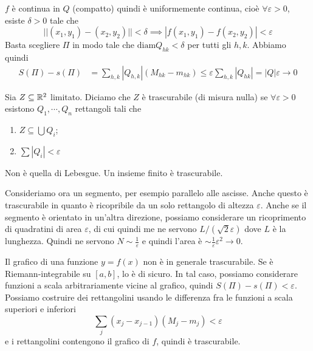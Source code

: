 \documentclass[a4paper]{article}
\begin{document}
\begin{snippetproof}{}
    \(f\) è continua in \(Q\) (compatto) quindi è uniformemente continua,
    cioè \(\forall \varepsilon > 0\), esiste \(\delta > 0\)
    tale che
    \[
        ||(x_1,y_1) - (x_2, y_2)|| < \delta \implies |f(x_1,y_1) - f(x_2, y_2)| < \varepsilon
    \]
    Basta scegliere \(\Pi\) in modo tale che \(\text{diam} Q_{hk} < \delta\)
    per tutti gli \(h,k\). Abbiamo quindi
    \begin{align*}
        S(\Pi)- s(\Pi)
        &= \sum_{h,k} |Q_{h,k}| (M_{hk} - m_{hk})
        \leq \varepsilon \sum_{h,k} |Q_{hk}| = |Q|\varepsilon \to 0
    \end{align*}
\end{snippetproof}

\begin{snippetdefinition}{}
    Sia \(Z \subseteq \mathbb{R}^2\) limitato.
    Diciamo che \(Z\) è trascurabile (di misura nulla)
    se \(\forall \varepsilon > 0\) esistono \(Q_1, \cdots, Q_n\) rettangoli tali che
    \begin{enumerate}
        \item \(Z \subseteq \bigcup Q_i\);
        \item \(\sum |Q_i| < \varepsilon\)
    \end{enumerate} %
\end{snippetdefinition}

Non è quella di Lebesgue. Un insieme finito è trascurabile.

Consideriamo ora un segmento, per esempio parallelo alle ascisse.
Anche questo è trascurabile in quanto è ricopribile da un solo rettangolo
di altezza \(\varepsilon\). Anche se il segmento è orientato
in un'altra direzione, possiamo considerare
un ricoprimento di quadratini di area \(\varepsilon\),
di cui quindi me ne servono \(L / (\sqrt{2}\varepsilon)\)
dove \(L\) è la lunghezza. Quindi ne servono \(N \sim \frac{1}{\varepsilon}\)
e quindi l'area è \(\sim \frac{1}{\varepsilon}\varepsilon^2 \to 0\).

Il grafico di una funzione \(y = f(x)\) non è in generale trascurabile.
Se è Riemann-integrabile su \([a,b]\), lo è di sicuro.
In tal caso, possiamo considerare funzioni a scala arbitrariamente vicine
al grafico, quindi \(S(\Pi)- s(\Pi) < \varepsilon\).
Possiamo costruire dei rettangolini usando le differenza fra
le funzioni a scala superiori e inferiori
\[
    \sum_j (x_j-x_{j-1})(M_j - m_j) < \varepsilon
\]
e i rettangolini contengono il grafico di \(f\), quindi è trascurabile.
\end{document}

